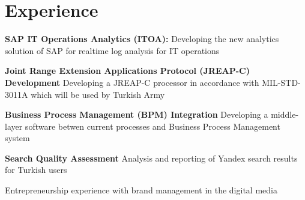 \section{Experience}


\vspace{\topsep} %
\begin{tightitemize}
  \item \textbf{SAP IT Operations Analytics (ITOA):} Developing the new analytics solution of SAP for realtime log analysis for IT operations
\end{tightitemize}

\sectionspace %



\begin{tightitemize}
\item \textbf{Joint Range Extension Applications Protocol (JREAP-C) Development} Developing a JREAP-C processor in accordance with MIL-STD-3011A which will be used by Turkish Army
\item \textbf{Business Process Management (BPM) Integration} Developing a middle-layer software betwen current processes and
Business Process Management system
\end{tightitemize}

\sectionspace %



\begin{tightitemize}
\item \textbf{Search Quality Assessment} Analysis and reporting of Yandex search results for Turkish users
\end{tightitemize}

\sectionspace %



\begin{tightitemize}
\item Entrepreneurship experience with brand management in the digital media
\end{tightitemize}

\sectionspace %

